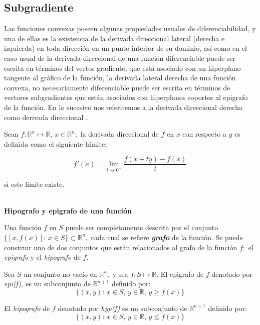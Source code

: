 \subsection{Subgradiente}

Las funciones convexas poseen algunas propiedades usuales de diferenciabilidad, y una de ellas es la existencia de la derivada direccional 
lateral (derecha e izquierda) en toda direcci\'on en un punto interior de su dominio, as\'i como en el caso usual de la derivada direccional 
de una funci\'on diferenciable puede ser escrita en t\'erminos del vector gradiente, que est\'a asociado con un hiperplano tangente al
gr\'afico de la funci\'on, la derivada lateral derecha de una funci\'on convexa, no necesariamente diferenciable puede ser escrita en
t\'erminos de vectores subgradientes que est\'an asociados con hiperplanos soportes al epigrafo de la funci\'on. En lo sucesivo nos 
referiremos a la derivada direccional derecha como derivada direccional \cite{navarro}.
\medskip

{ Sean $f: \mathbb{R}^n \longmapsto \mathbb{R},\, x\in \mathbb{R}^n;$ la derivada direccional de $f$ en $x$ con respecto a
$y$ es definida como el siguiente lı\'imite:


\[f'(x) = \displaystyle{\lim_{t \rightarrow 0^{+} }\dfrac{f(x + ty)- f(x)}{t}}\]

si este l\'imite existe. \label{derivada-dir}}\\


\textbf{\large Hipografo y epigrafo de una funci\'on}
\medskip

Una funci\'on $f$ en $S$ puede ser completamente descrita por el conjunto $\{[x, f(x)]:\, x \in S\} \subset \mathbb{R}^n,$ cada cual se 
refiere \textbf{\itshape grafo} de la funci\'on. Se puede construir uno de dos conjuntos que est\'an relacionados al grafo de la funci\'on 
$f:$ el {\it epigrafo} y el {\it hipografo} de $f.$
\medskip

{ Sea $S$ un conjunto no vac\'io en $\mathbb{R}^n,$ y sea $f: S \longmapsto \mathbb{R}.$ El epigrafo de $f$ denotado por 
{\it epi(f),} es un subconjunto de $\mathbb{R}^{n+1}$ definido por:
$$\{(x, y):\, x \in S,\,  y \in \mathbb{R},\, y \geqslant f(x)\}$$

El {\it hipografo} de $f$ denotado por {\it hyp(f)} es un subconjunto de $\mathbb{R}^{n+1}$ definido por:
$$\{(x, y):\, x \in S,\, y \in \mathbb{R},\, y \leqslant f(x)\}$$  \label{epi-hipo}}


